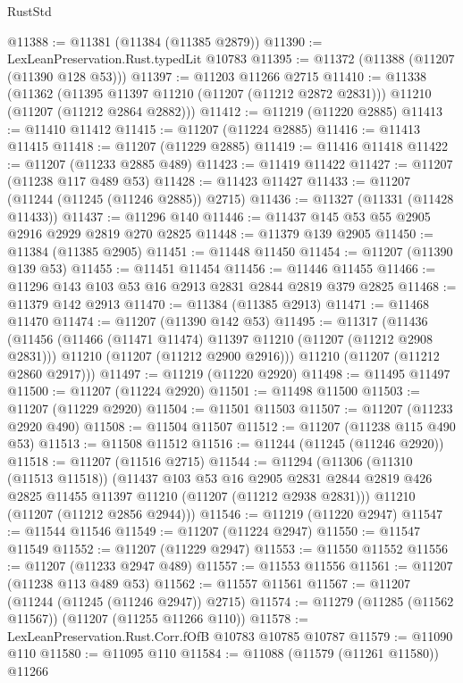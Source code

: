 \begin{lexlean}{RustStd}
\begin{coremodule}
@11388 := @11381 (@11384 (@11385 @2879))
@11390 := LexLeanPreservation.Rust.typedLit @10783
@11395 := @11372 (@11388 (@11207 (@11390 @128 @53)))
@11397 := @11203 @11266 @2715
@11410 := @11338
    (@11362
      (@11395 @11397 @11210 (@11207 (@11212 @2872 @2831)))
      @11210
      (@11207 (@11212 @2864 @2882)))
@11412 := @11219 (@11220 @2885)
@11413 := @11410 @11412
@11415 := @11207 (@11224 @2885)
@11416 := @11413 @11415
@11418 := @11207 (@11229 @2885)
@11419 := @11416 @11418
@11422 := @11207 (@11233 @2885 @489)
@11423 := @11419 @11422
@11427 := @11207 (@11238 @117 @489 @53)
@11428 := @11423 @11427
@11433 := @11207 (@11244 (@11245 (@11246 @2885)) @2715)
@11436 := @11327 (@11331 (@11428 @11433))
@11437 := @11296 @140
@11446 := @11437 @145 @53 @55 @2905 @2916 @2929 @2819 @270 @2825
@11448 := @11379 @139 @2905
@11450 := @11384 (@11385 @2905)
@11451 := @11448 @11450
@11454 := @11207 (@11390 @139 @53)
@11455 := @11451 @11454
@11456 := @11446 @11455
@11466 := @11296 @143 @103 @53 @16 @2913 @2831 @2844 @2819 @379 @2825
@11468 := @11379 @142 @2913
@11470 := @11384 (@11385 @2913)
@11471 := @11468 @11470
@11474 := @11207 (@11390 @142 @53)
@11495 := @11317
    (@11436
      (@11456
        (@11466 (@11471 @11474) @11397 @11210 (@11207 (@11212 @2908 @2831)))
        @11210
        (@11207 (@11212 @2900 @2916)))
      @11210
      (@11207 (@11212 @2860 @2917)))
@11497 := @11219 (@11220 @2920)
@11498 := @11495 @11497
@11500 := @11207 (@11224 @2920)
@11501 := @11498 @11500
@11503 := @11207 (@11229 @2920)
@11504 := @11501 @11503
@11507 := @11207 (@11233 @2920 @490)
@11508 := @11504 @11507
@11512 := @11207 (@11238 @115 @490 @53)
@11513 := @11508 @11512
@11516 := @11244 (@11245 (@11246 @2920))
@11518 := @11207 (@11516 @2715)
@11544 := @11294
    (@11306
      (@11310 (@11513 @11518))
      (@11437
        @103
        @53
        @16
        @2905
        @2831
        @2844
        @2819
        @426
        @2825
        @11455
        @11397
        @11210
        (@11207 (@11212 @2938 @2831)))
      @11210
      (@11207 (@11212 @2856 @2944)))
@11546 := @11219 (@11220 @2947)
@11547 := @11544 @11546
@11549 := @11207 (@11224 @2947)
@11550 := @11547 @11549
@11552 := @11207 (@11229 @2947)
@11553 := @11550 @11552
@11556 := @11207 (@11233 @2947 @489)
@11557 := @11553 @11556
@11561 := @11207 (@11238 @113 @489 @53)
@11562 := @11557 @11561
@11567 := @11207 (@11244 (@11245 (@11246 @2947)) @2715)
@11574 := @11279 (@11285 (@11562 @11567)) (@11207 (@11255 @11266 @110))
@11578 := LexLeanPreservation.Rust.Corr.fOfB @10783 @10785 @10787
@11579 := @11090 @110
@11580 := @11095 @110
@11584 := @11088 (@11579 (@11261 @11580)) @11266

\end{coremodule}
\end{lexlean}
